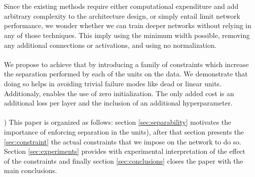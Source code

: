 \\\\
Since the existing methods require either computational expenditure and add arbitrary complexity to the architecture design, or simply entail limit network performance, we wonder whether we can train deeper networks without relying in any of those techniques. This imply using the minimum width possible, removing any additional connections or activations, and using no normalization. 
\\\\
We propose to achieve that by introducing a family of constraints which increase the separation performed by each of the units on the data. We demonstrate that doing so helps in avoiding trivial failure modes like dead or linear units. Additionaly, enables the use of zero initialization. The only added cost is an additional loss per layer and the inclusion of an additional hyperparameter. 
\\\\)
This paper is organized as follows: section \ref{sec:separability} motivates the importance of enforcing separation in the units), after that section presents the \ref{sec:constraint} the actual constraints that we impose on the network to do so. Section \ref{sec:experiments} provides with experimental interpretation of the effect of the constraints and finally section \ref{sec:conclusions} closes the paper with the main conclusions.